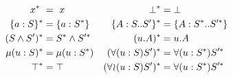 \begin{align*}
    x^{*} \           &= \ x                         & \bot^{*}              &= \bot                            \\
    \{a : S\}^{*}   &= \{a : S^{*}\}         & \{A : S .. S'\}^{*}   &= \{A : S^{*} .. S'^{*}\} \\
    (S \wedge S')^{*} &= S^{*} \wedge S'^{*} & (u.A)^{*}             &= u.A                             \\
    \mu(u : S)^{*}    &= \mu(u : S^{*})          & (\forall(u:S)S')^{*} &= \forall(u:S^{*})S'^{*} \\
    \top^{*}          &= \top                        & (\forall\!\wr\!(u:S)S')^{*} &= \forall(u:S^{*})S'^{*}
\end{align*}
